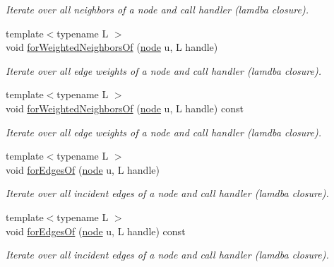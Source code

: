\begin{DoxyCompactItemize}
\begin{DoxyCompactList}\small\item\em Iterate over all neighbors of a node and call handler (lamdba closure). \end{DoxyCompactList}\item 
{\footnotesize template$<$typename L $>$ }\\void \hyperlink{class_networ_kit_1_1_graph_a62c59e656987e72e2386a70635e978e1}{for\-Weighted\-Neighbors\-Of} (\hyperlink{namespace_networ_kit_a61914158fd771265be48de9942369160}{node} u, L handle)
\begin{DoxyCompactList}\small\item\em Iterate over all edge weights of a node and call handler (lamdba closure). \end{DoxyCompactList}\item 
{\footnotesize template$<$typename L $>$ }\\void \hyperlink{class_networ_kit_1_1_graph_af94709f5bb5ee071d5d1e0b4292db525}{for\-Weighted\-Neighbors\-Of} (\hyperlink{namespace_networ_kit_a61914158fd771265be48de9942369160}{node} u, L handle) const 
\begin{DoxyCompactList}\small\item\em Iterate over all edge weights of a node and call handler (lamdba closure). \end{DoxyCompactList}\item 
{\footnotesize template$<$typename L $>$ }\\void \hyperlink{class_networ_kit_1_1_graph_afc892cbb7e1df4a83c718decae4ad377}{for\-Edges\-Of} (\hyperlink{namespace_networ_kit_a61914158fd771265be48de9942369160}{node} u, L handle)
\begin{DoxyCompactList}\small\item\em Iterate over all incident edges of a node and call handler (lamdba closure). \end{DoxyCompactList}\item 
{\footnotesize template$<$typename L $>$ }\\void \hyperlink{class_networ_kit_1_1_graph_a7d7d282c67bbe28e5d38086f4a7ca2c9}{for\-Edges\-Of} (\hyperlink{namespace_networ_kit_a61914158fd771265be48de9942369160}{node} u, L handle) const 
\begin{DoxyCompactList}\small\item\em Iterate over all incident edges of a node and call handler (lamdba closure). \end{DoxyCompactList}\item 

\end{DoxyCompactItemize}
